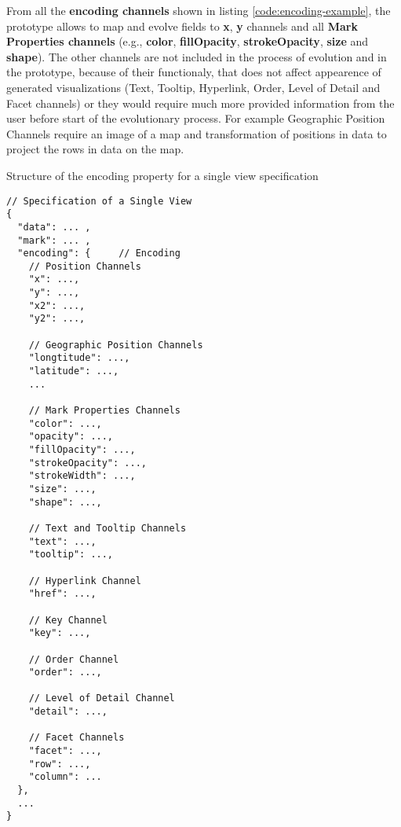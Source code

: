 From all the \textbf{encoding channels} shown in listing \ref{code:encoding-example}, the prototype allows to map and evolve fields to \textbf{x}, \textbf{y} channels and all \textbf{Mark Properties channels} (e.g., \textbf{color}, \textbf{fillOpacity}, \textbf{strokeOpacity}, \textbf{size} and \textbf{shape}). The other channels are not included in the process of evolution and in the prototype, because of their functionaly, that does not affect appearence of generated visualizations (Text, Tooltip, Hyperlink, Order, Level of Detail and Facet channels) or they would require much more provided information from the user before start of the evolutionary process. For example Geographic Position Channels require an image of a map and transformation of positions in data to project the rows in data on the map.
\begin{listing}[htbp]
\caption{\label{code:encoding-example}Structure of the encoding property for a single view specification \cite{vega-lite-encoding-single-view}}
\begin{verbatim}
// Specification of a Single View
{
  "data": ... ,
  "mark": ... ,
  "encoding": {     // Encoding
    // Position Channels
    "x": ...,
    "y": ...,
    "x2": ...,
    "y2": ...,

    // Geographic Position Channels
    "longtitude": ...,
    "latitude": ...,
    ...

    // Mark Properties Channels
    "color": ...,
    "opacity": ...,
    "fillOpacity": ...,
    "strokeOpacity": ...,
    "strokeWidth": ...,
    "size": ...,
    "shape": ...,

    // Text and Tooltip Channels
    "text": ...,
    "tooltip": ...,

    // Hyperlink Channel
    "href": ...,

    // Key Channel
    "key": ...,

    // Order Channel
    "order": ...,

    // Level of Detail Channel
    "detail": ...,

    // Facet Channels
    "facet": ...,
    "row": ...,
    "column": ...
  },
  ...
}
\end{verbatim}
\end{listing}

